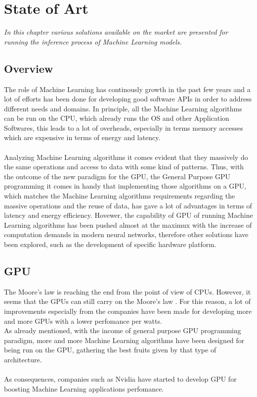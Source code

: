 \chapter{State of Art}
\textit{In this chapter various solutions available on the market are presented for running the inference process of Machine Learning models.}

\section{Overview}
The role of Machine Learning has continously growth in the past few years and a lot of efforts has been done for developing good software APIs in order to address different needs and domains. \newline In principle, all the Machine Learning algorithms can be run on the CPU, which already runs the OS and other Application Softwares, this leads to a lot of overheads, especially in terms memory accesses which are expensive in terms of energy and latency. \\\\
Analyzing Machine Learning algorithms  it comes evident that they massively do the same operations and access to data with some kind of patterns. Thus, with the outcome of the new paradigm for the GPU, the General Purpose GPU programming it comes in handy that implementing those algorithms on a GPU, which matches the Machine Learning algorithms requirements regarding the massive operations and the reuse of data, has gave a lot of advantages in terms of latency and energy efficiency. Hovewer, the capability of GPU of running Machine Learning algorithms has been pushed almost at the maximux with the increase of computation demands in modern neural networks, therefore other solutions have been explored, such as the development of specific hardware platform.


\section{GPU}
The Moore's law is reaching the end from the point of view of CPUs. However, it seems that the GPUs can still carry on the Moore's law \cite{5496638}.\newline
For this reason, a lot of improvements especially from the companies have been made for developing more and more GPUs with a lower perfomance per watts.\\
As already mentioned, with the income of general purpose GPU programming paradigm, more and more Machine Learning algorithms have been designed for being run on the GPU, gathering the best fruits given by that type of architecture.\\\\
As consequences, companies such as Nvidia have started to develop GPU for boosting Machine Learning applications perfomance.
